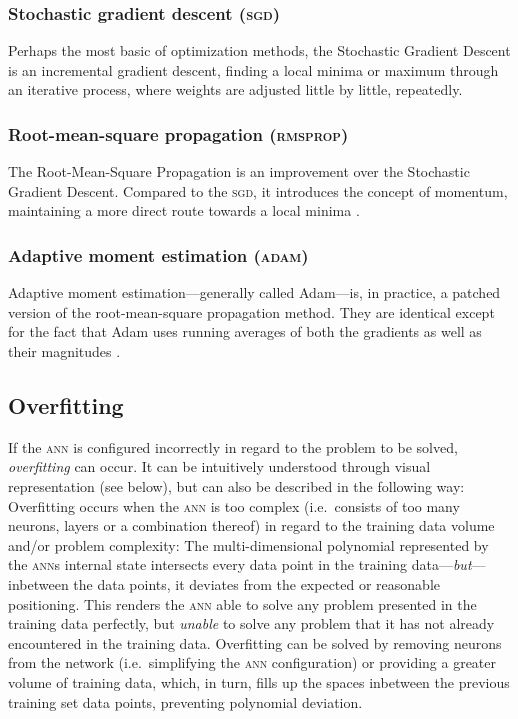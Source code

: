 \begin{multicols}{2}
\subsubsection{Stochastic gradient descent (\textsc{sgd})}

Perhaps the most basic of optimization methods, the Stochastic Gradient Descent
is an incremental gradient descent, finding a local minima or maximum through an
iterative process, where weights are adjusted little by little, repeatedly.

\subsubsection{Root-mean-square propagation (\textsc{rmsprop})}

The Root-Mean-Square Propagation is an improvement over the Stochastic Gradient
Descent.  Compared to the \textsc{sgd}, it introduces the concept of momentum,
maintaining a more direct route towards a local minima
\citep{tieleman2012lecture}.

\subsubsection{Adaptive moment estimation (\textsc{adam})}

Adaptive moment estimation---generally called Adam---is, in practice, a patched
version of the root-mean-square propagation method.  They are identical except
for the fact that Adam uses running averages of both the gradients as well as
their magnitudes \citep{kingma2014adam}.

\subsection{Overfitting}

If the \textsc{ann} is configured incorrectly in regard to the problem to be
solved, \textit{overfitting} can occur.  It can be intuitively understood
through visual representation (see below), but can also be described in the
following way: Overfitting occurs when the \textsc{ann} is too complex (i.e.\
consists of too many neurons, layers or a combination thereof) in regard to the
training data volume and/or problem complexity: The multi-dimensional polynomial
represented by the \textsc{ann}s internal state intersects every data point in
the training data---\textit{but}---inbetween the data points, it deviates from
the expected or reasonable positioning.  This renders the \textsc{ann} able to
solve any problem presented in the training data perfectly, but \textit{unable}
to solve any problem that it has not already encountered in the training data.
Overfitting can be solved by removing neurons from the network (i.e.\
simplifying the \textsc{ann} configuration) or providing a greater volume of
training data, which, in turn, fills up the spaces inbetween the previous
training set data points, preventing polynomial deviation.


\end{multicols}
